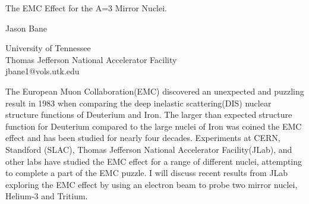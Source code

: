 \documentclass[a4paper]{article}
\begin{document}

\Large
 \begin{center}
The EMC Effect for the A=3 Mirror Nuclei.\\ 

\hspace{10pt}

\Large
Jason Bane\\

\hspace{10pt}

\normalsize  
University of Tennessee\\
Thomas Jefferson National Accelerator Facility\\
jbane1@vols.utk.edu\\

\end{center}

\hspace{10pt}

\large
The European Muon Collaboration(EMC) discovered an unexpected and puzzling result in 1983 when comparing the deep inelastic scattering(DIS) nuclear structure functions of Deuterium and Iron. The larger than expected structure function for Deuterium compared to the large nuclei of  Iron was coined the EMC effect and has been studied for nearly four decades. Experiments at CERN, Standford (SLAC), Thomas Jefferson National Accelerator Facility(JLab), and other labs have studied the EMC effect for a range of different nuclei, attempting to complete a part of the EMC puzzle. I will discuss recent results from JLab exploring the EMC effect by using an electron beam to probe two mirror nuclei, Helium-3 and Tritium. 
\end{document}
